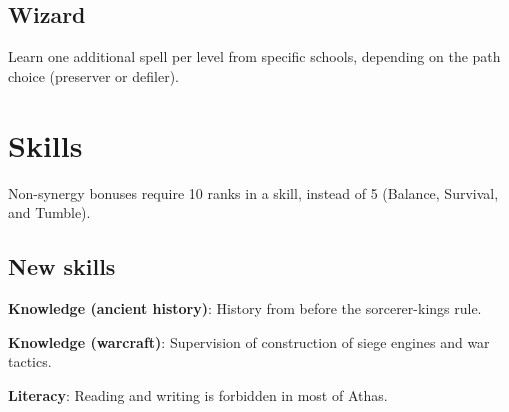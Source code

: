 \subsection{Wizard}
\begin{itemize*}
\item Learn one additional spell per level from specific schools, depending on the path choice (preserver or defiler).
\end{itemize*}

\section{Skills}
Non-synergy bonuses require 10 ranks in a skill, instead of 5 (Balance, Survival, and Tumble).


\subsection{New skills}
\begin{itemize*}
\item \textbf{Knowledge (ancient history)}: History from before the sorcerer-kings rule.
\item \textbf{Knowledge (warcraft)}: Supervision of construction of siege engines and war tactics.
\item \textbf{Literacy}: Reading and writing is forbidden in most of Athas.
\end{itemize*}

